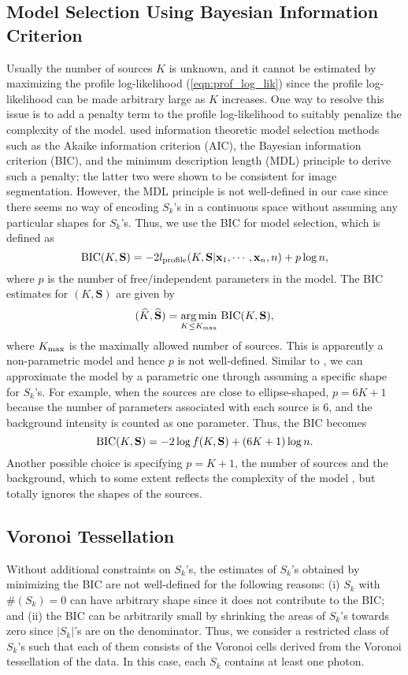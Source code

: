 \documentclass{aastex61}
\begin{document}
\subsection{Model Selection Using Bayesian Information Criterion}\label{sec:BIC}
Usually the number of sources $K$ is unknown, and it cannot be estimated by maximizing the profile log-likelihood (\ref{eqn:prof_log_lik}) since the profile log-likelihood can be made arbitrary large as $K$ increases.
One way to resolve this issue is to add a penalty term to the profile log-likelihood to suitably penalize the complexity of the model. \citet{Aue-11} used information theoretic model selection methods such as the Akaike information criterion (AIC), the Bayesian information criterion (BIC), and the minimum description length (MDL) principle to derive such a penalty; the latter two were shown to be consistent for image segmentation.
However, the MDL principle is not well-defined in our case since there seems no way of encoding $S_k$'s in a continuous space without assuming any particular shapes for $S_k$'s. Thus, we use the BIC for model selection, which is defined as
$${\rm BIC}(K, \mathbf{S})=-2l_{\rm profile}(K, \mathbf{S}|\mathbf{x}_1, \cdots, \mathbf{x}_n, n)+p\log n,$$
where $p$ is the number of free/independent parameters in the model. The BIC estimates for $(K, \mathbf{S})$ are given by
$$(\widehat{K}, \widehat{\mathbf{S}})=\underset{K\leq K_{\rm max}}{\operatorname{arg\, min}}~{\rm BIC}(K, \mathbf{S}),$$
where $K_{\rm max}$ is the maximally allowed number of sources.
This is apparently a non-parametric model and hence $p$ is not well-defined. Similar to \citet{Aue-11}, we can approximate the model by a parametric one through assuming a specific shape for $S_k$'s.
For example, when the sources are close to ellipse-shaped, $p=6K+1$ because 
the number of parameters associated with each source is $6$, and the background intensity is counted as one parameter. Thus, the BIC becomes
$${\rm BIC}(K, \mathbf{S})=-2\log f(K, \mathbf{S})+(6K+1)\log n.$$
 Another possible choice is specifying $p=K+1$, the number of sources and the background, which to some extent reflects the complexity
of the model \citep{Magnussen-06}, but totally ignores the shapes of the sources.

\subsection{Voronoi Tessellation}
Without additional constraints on $S_k$'s, the estimates of $S_k$'s obtained by minimizing the BIC are not well-defined for the following reasons: (i) $S_k$ with $\#(S_k)=0$ can have arbitrary shape 
since it does not contribute to the BIC; and (ii) the BIC can be arbitrarily small by shrinking the areas of $S_k$'s towards zero since $|S_k|$'s are on the denominator. Thus, we consider a restricted class of $S_k$'s such that each of them consists of the Voronoi cells derived from the Voronoi tessellation of the data. In this case, each $S_k$ contains at least one photon.
\end{document}
